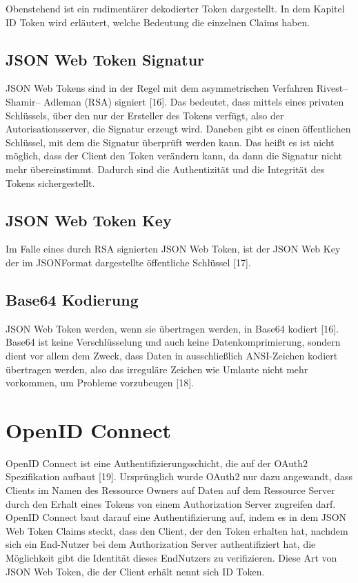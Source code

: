 Obenstehend ist ein rudimentärer dekodierter Token dargestellt. In dem Kapitel ID Token
wird erläutert, welche Bedeutung die einzelnen Claims haben.

\subsection{JSON Web Token Signatur}
\label{subsec:background:second_section:first_subsection}

JSON Web Tokens sind in der Regel mit dem asymmetrischen Verfahren Rivest–Shamir–
Adleman (RSA) signiert [16]. Das bedeutet, dass mittels eines privaten Schlüssels, über den
nur der Ersteller des Tokens verfügt, also der Autorisationsserver, die Signatur erzeugt wird.
Daneben gibt es einen öffentlichen Schlüssel, mit dem die Signatur überprüft werden kann.
Das heißt es ist nicht möglich, dass der Client den Token verändern kann, da dann die
Signatur nicht mehr übereinstimmt. Dadurch sind die Authentizität und die Integrität des
Tokens sichergestellt.

\subsection{JSON Web Token Key}
\label{subsec:background:second_section:first_subsection}
Im Falle eines durch RSA signierten JSON Web Token, ist der JSON Web Key der im JSONFormat dargestellte öffentliche Schlüssel [17]. 

\subsection{Base64 Kodierung}
\label{subsec:background:second_section:first_subsection}
JSON Web Token werden, wenn sie übertragen werden, in Base64 kodiert [16]. Base64 ist
keine Verschlüsselung und auch keine Datenkomprimierung, sondern dient vor allem dem
Zweck, dass Daten in ausschließlich ANSI-Zeichen kodiert übertragen werden, also das
irreguläre Zeichen wie Umlaute nicht mehr vorkommen, um Probleme vorzubeugen [18]. 

\section{OpenID Connect}
\label{sec:background:third_section}
OpenID Connect ist eine Authentifizierungsschicht, die auf der OAuth2 Spezifikation
aufbaut [19].
Ursprünglich wurde OAuth2 nur dazu angewandt, dass Clients im Namen des Ressource
Owners auf Daten auf dem Ressource Server durch den Erhalt eines Tokens von einem
Authorization Server zugreifen darf.
OpenID Connect baut darauf eine Authentifizierung auf, indem es in dem JSON Web Token
Claims steckt, dass den Client, der den Token erhalten hat, nachdem sich ein End-Nutzer bei
dem Authorization Server authentifiziert hat, die Möglichkeit gibt die Identität dieses EndNutzers zu verifizieren.
Diese Art von JSON Web Token, die der Client erhält nennt sich ID Token. 

